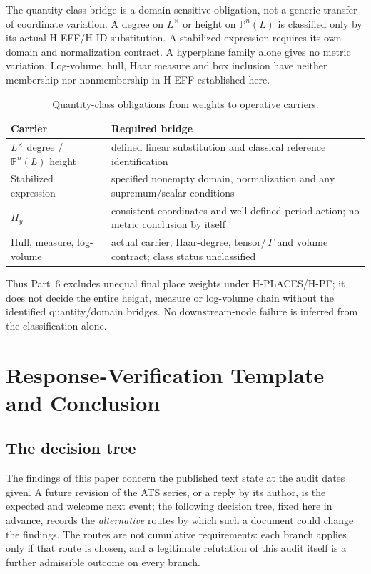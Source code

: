\documentclass[11pt,a4paper]{article}
\theoremstyle{definition}
\theoremstyle{remark}
\begin{document}
The quantity-class bridge is a domain-sensitive obligation, not a
generic transfer of coordinate variation. A degree on $L^\times$ or
height on $\mathbb P^n(L)$ is classified only by its actual H-EFF/H-ID
substitution. A stabilized expression requires its own domain and
normalization contract. A hyperplane family alone gives no metric
variation. Log-volume, hull, Haar measure and box inclusion have neither
membership nor nonmembership in H-EFF established here.
\begin{table}[htbp]\centering\small
\caption{Quantity-class obligations from weights to operative carriers.}
\label{tab:quantity-class-bridge}
\begin{tabularx}{\textwidth}{@{}>{\raggedright\arraybackslash}p{} >{\raggedright\arraybackslash}X@{}}
\toprule Carrier & Required bridge \\\midrule
$L^\times$ degree / $\mathbb P^n(L)$ height & defined linear substitution and classical reference identification \\
Stabilized expression & specified nonempty domain, normalization and any supremum/scalar conditions \\
$H_y$ & consistent coordinates and well-defined period action; no metric conclusion by itself \\
Hull, measure, log-volume & actual carrier, Haar-degree, tensor/\,$\Gamma$ and volume contract; class status unclassified \\
\bottomrule\end{tabularx}\end{table}
Thus Part~6 excludes unequal final place weights under H-PLACES/H-PF;
it does not decide the entire height, measure or log-volume chain without
the identified quantity/domain bridges. No downstream-node failure is
inferred from the classification alone.

\section{Response-Verification Template and Conclusion}\label{sec:template}

\subsection{The decision tree}

The findings of this paper concern the published text state at the audit
dates given. A future revision of the ATS series, or a reply by its author,
is the expected and welcome next event; the following decision tree, fixed
here in advance, records the \emph{alternative} routes by which such a
document could change the findings. The routes are not cumulative
requirements: each branch applies only if that route is chosen, and a
legitimate refutation of this audit itself is a further admissible outcome
on every branch.
\end{document}
